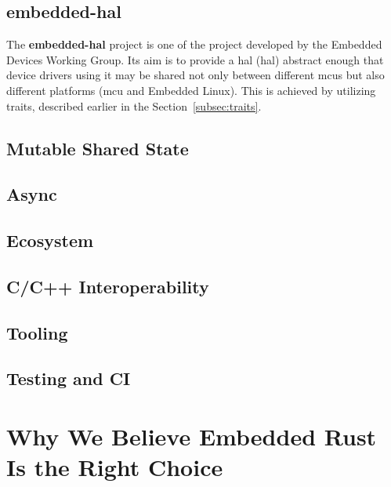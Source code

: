 \subsection{embedded-hal}
\label{subsec:embedded_hal}
The \textbf{embedded-hal} project\cite{rust_embedded_devices_wg_rust-embeddedembedded-hal_2021} is one of the project developed by the Embedded Devices Working Group.
Its aim is to provide a \acs{hal} (\acl{hal}) abstract enough that device drivers using it may be shared not only between different \acs{mcu}s but also different platforms (\acs{mcu} and Embedded Linux).
This is achieved by utilizing traits, described earlier in the Section~\ref{subsec:traits}.

\subsection{Mutable Shared State}
\label{subsec:mut_shared_state}
\cite{rtic}
\cite{egger_look_nodate}

\subsection{Async}
\label{subsec:async}
\cite{aparicio_concurrency_nodate}
\cite{schattinger_asyncawait_2020} %

\subsection{Ecosystem}
\label{subsec:ecosystem}

\subsection{C/C++ Interoperability}
\label{subsec:ccpp_interop}

\subsection{Tooling}
\label{subsec:tooling}

\subsection{Testing and CI}
\label{subsec:testing_ci}

\section{Why We Believe Embedded Rust Is the Right Choice}
\label{sec:embedded_rust_reasoning}
